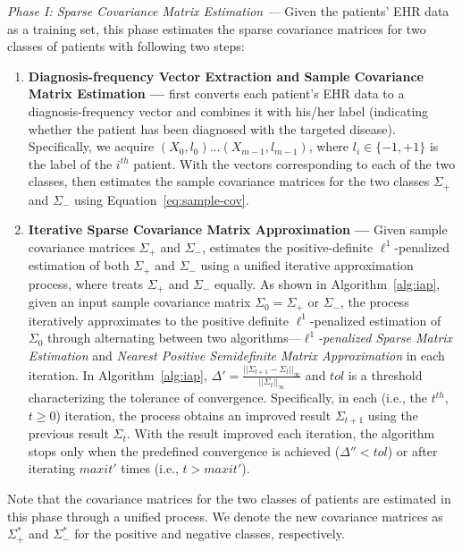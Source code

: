 \emph{Phase I: Sparse Covariance Matrix Estimation --- } Given the patients' EHR data as a training set, this phase estimates the sparse covariance matrices for two classes of patients with following two steps:
\begin{enumerate}
    \item \textbf{Diagnosis-frequency Vector Extraction and Sample Covariance Matrix Estimation --- } \TheName{} first converts each patient's EHR data to a diagnosis-frequency vector and combines it with his/her label (indicating whether the patient has been diagnosed with the targeted disease). Specifically, we acquire $(X_0,l_0)\dots (X_{m-1},l_{m-1})$, where $l_i\in\{-1,+1\}$ is the label of the $i^{th}$ patient. With the vectors corresponding to each of the two classes, \TheName{} then estimates the sample covariance matrices for the two classes $\Sigma_+$ and $\Sigma_-$ using Equation~\ref{eq:sample-cov}.

    \item \textbf{Iterative Sparse Covariance Matrix Approximation --- } Given sample covariance matrices $\Sigma_+$ and $\Sigma_-$, \TheName{} estimates the positive-definite $\ell^1$-penalized estimation of both $\Sigma_+$ and $\Sigma_-$ using a unified iterative approximation process, where \TheName{} treats $\Sigma_+$ and $\Sigma_-$ equally. 
    As shown in Algorithm~\ref{alg:iap}, given an input sample covariance matrix $\Sigma_0=\Sigma_+$ or $\Sigma_-$, the process iteratively approximates to the positive definite $\ell^1$-penalized estimation of $\Sigma_0$ through alternating between two algorithms---\emph{$\ell^1$-penalized Sparse Matrix Estimation} and \emph{Nearest Positive Semidefinite Matrix Approximation} in each iteration. In Algorithm~\ref{alg:iap}, $\Delta'=\frac{||\Sigma_{t+1}-\Sigma_{t}||_\infty}{||\Sigma_{t}||_\infty}$ and $tol$ is a threshold characterizing the tolerance of convergence. 
    Specifically, in each (i.e., the $t^{th}$, $t\geq 0$) iteration, the process obtains an improved result $\Sigma_{t+1}$ using the previous result $\Sigma_{t}$. 
    With the result improved each iteration, the algorithm stops only when the predefined convergence is achieved ($\Delta''< tol$) or after iterating $maxit'$ times (i.e., $t>maxit'$).


\end{enumerate}
Note that the covariance matrices for the two classes of patients are estimated in this phase through a unified process.
We denote the new covariance matrices as $\Sigma_+^*$ and $\Sigma_-^*$ for the positive and negative classes, respectively.

